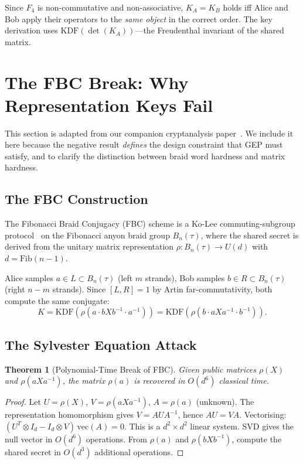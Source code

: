 \documentclass[11pt,letterpaper]{article}
\newtheorem{theorem}{Theorem}[section]
\theoremstyle{definition}
\begin{document}
\noindent Since $F_4$ is non-commutative and non-associative, $K_A = K_B$
holds iff Alice and Bob apply their operators to the \emph{same object} in the
correct order.  The key derivation uses $\mathrm{KDF}(\det(K_A))$---the
Freudenthal invariant of the shared matrix.

\section{The FBC Break: Why Representation Keys Fail}
\label{sec:fbc}

This section is adapted from our companion cryptanalysis
paper~\cite{parr2026fbc}. We include it here because the negative result
\emph{defines} the design constraint that GEP must satisfy, and to clarify
the distinction between braid word hardness and matrix hardness.

\subsection{The FBC Construction}

The Fibonacci Braid Conjugacy (FBC) scheme is a Ko-Lee commuting-subgroup
protocol~\cite{kolee2000} on the Fibonacci anyon braid group $B_n(\tau)$,
where the shared secret is derived from the unitary matrix representation
$\rho: B_n(\tau) \to U(d)$ with $d = \mathrm{Fib}(n-1)$.

Alice samples $a \in L \subset B_n(\tau)$ (left $m$ strands), Bob samples
$b \in R \subset B_n(\tau)$ (right $n-m$ strands).  Since $[L,R] = 1$ by
Artin far-commutativity, both compute the same conjugate:
\[
K = \mathrm{KDF}(\rho(a \cdot bXb^{-1} \cdot a^{-1})) =
    \mathrm{KDF}(\rho(b \cdot aXa^{-1} \cdot b^{-1})).
\]

\subsection{The Sylvester Equation Attack}

\begin{theorem}[Polynomial-Time Break of FBC]\label{thm:fbc-break}
Given public matrices $\rho(X)$ and $\rho(aXa^{-1})$, the matrix $\rho(a)$
is recovered in $O(d^6)$ classical time.
\end{theorem}
\begin{proof}
Let $U = \rho(X)$, $V = \rho(aXa^{-1})$, $A = \rho(a)$ (unknown).
The representation homomorphism gives $V = AUA^{-1}$, hence $AU = VA$.
Vectorising: $(U^T \otimes I_d - I_d \otimes V)\,\mathrm{vec}(A) = 0$.
This is a $d^2 \times d^2$ linear system.  SVD gives the null vector in
$O(d^6)$ operations.  From $\rho(a)$ and $\rho(bXb^{-1})$, compute the shared
secret in $O(d^3)$ additional operations.
\end{proof}
\end{document}
